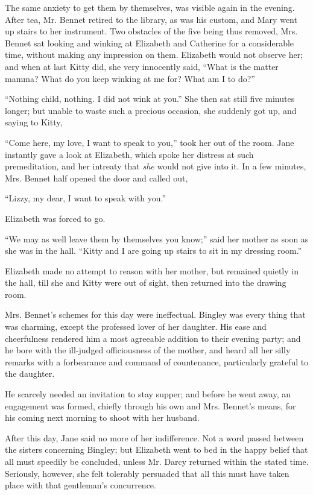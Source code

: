The same anxiety to get them by themselves, was
visible again in the evening. After tea, Mr. Bennet retired
to the library, as was his custom, and Mary went up stairs
to her instrument. Two obstacles of the five being thus
removed, Mrs. Bennet sat looking and winking at Elizabeth
and Catherine for a considerable time, without making
any impression on them. Elizabeth would not observe
her; and when at last Kitty did, she very innocently
said, “What is the matter mamma? What do you keep
winking at me for? What am I to do?”

“Nothing child, nothing. I did not wink at you.”
She then sat still five minutes longer; but unable to
waste such a precious occasion, she suddenly got up, and
saying to Kitty,

“Come here, my love, I want to speak to you,” took
her out of the room. Jane instantly gave a look at Elizabeth,
which spoke her distress at such premeditation, and
her intreaty that \textit{she} would not give into it. In a few
minutes, Mrs. Bennet half opened the door and called out,

“Lizzy, my dear, I want to speak with you.”

Elizabeth was forced to go.

“We may as well leave them by themselves you
know;” said her mother as soon as she was in the hall.
“Kitty and I are going up stairs to sit in my dressing room.”

Elizabeth made no attempt to reason with her mother,
but remained quietly in the hall, till she and Kitty were
out of sight, then returned into the drawing room.

Mrs. Bennet’s schemes for this day were ineffectual.
Bingley was every thing that was charming, except the
professed lover of her daughter. His ease and cheerfulness
rendered him a most agreeable addition to their evening
party; and he bore with the ill-judged officiousness of
the mother, and heard all her silly remarks with a forbearance
and command of countenance, particularly
grateful to the daughter.

He scarcely needed an invitation to stay supper; and
before he went away, an engagement was formed, chiefly
through his own and Mrs. Bennet’s means, for his coming
next morning to shoot with her husband.

After this day, Jane said no more of her indifference.
Not a word passed between the sisters concerning Bingley;
but Elizabeth went to bed in the happy belief that all
must speedily be concluded, unless Mr. Darcy returned
within the stated time. Seriously, however, she felt
tolerably persuaded that all this must have taken place
with that gentleman’s concurrence.

